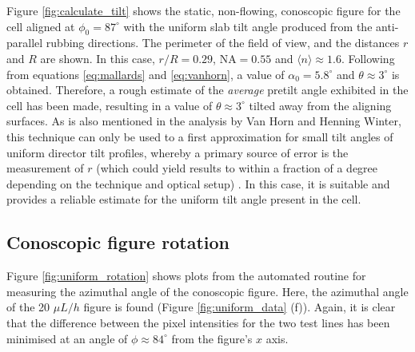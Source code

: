 \noindent Figure \ref{fig:calculate_tilt} shows the static, non-flowing, conoscopic figure for the cell aligned at $\phi_0=87^{\circ}$ with the uniform slab tilt angle produced from the anti-parallel rubbing directions. The perimeter of the field of view, and the distances $r$ and $R$ are shown. In this case, $r/R=0.29$, $\text{NA}=0.55$ and $\langle n\rangle\approx1.6$. Following from equations \ref{eq:mallards} and \ref{eq:vanhorn}, a value of $\alpha_0=5.8^{\circ}$ and $\theta\approx3^{\circ}$ is obtained. Therefore, a rough estimate of the \textit{average} pretilt angle exhibited in the cell has been made, resulting in a value of $\theta\approx3^{\circ}$ tilted away from the aligning surfaces. As is also mentioned in the analysis by Van Horn and Henning Winter, this technique can only be used to a first approximation for small tilt angles of uniform director tilt profiles, whereby a primary source of error is the measurement of $r$ (which could yield results to within a fraction of a degree depending on the technique and optical setup) \cite{Horn2001}. In this case, it is suitable and provides a reliable estimate for the uniform tilt angle present in the cell.

\subsection{Conoscopic figure rotation}
\label{sec:uniform_con_rot}
Figure \ref{fig:uniform_rotation} shows plots from the automated routine for measuring the azimuthal angle of the conoscopic figure. Here, the azimuthal angle of the 20 $\mu L/h$ figure is found (Figure \ref{fig:uniform_data} (f)). Again, it is clear that the difference between the pixel intensities for the two test lines has been minimised at an angle of $\phi\approx84^{\circ}$ from the figure's $x$ axis.

